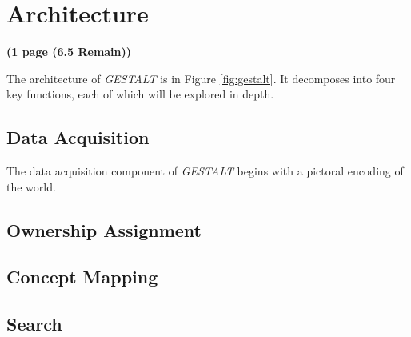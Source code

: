 \section{Architecture}
\label{section:architecture}
\textbf{(1 page (6.5 Remain))}

The architecture of \textit{GESTALT} is in Figure \ref{fig:gestalt}. It decomposes into four key functions, each of which will be explored in depth. 

\subsection{Data Acquisition}
The data acquisition component of \textit{GESTALT} begins with a pictoral encoding of the world.

\subsection{Ownership Assignment}

\subsection{Concept Mapping}

\subsection{Search}